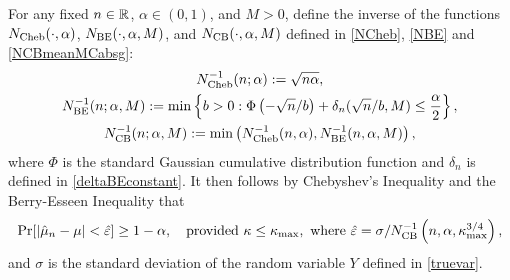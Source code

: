 \documentclass{iitthesis}
\theoremstyle{definition}
\begin{document}
For any fixed $n \in \mathbb{R}$, $\alpha \in (0,1)$, and $M>0$, define the inverse of the functions $N_{\text{Cheb}}(\cdot,\alpha)$, $N_{\text{BE}}(\cdot,\alpha,M)$, and $N_{\text{CB}}(\cdot,\alpha,M)$ defined in \eqref{NCheb}, \eqref{NBE} and \eqref{NCBmeanMCabsg}:
\begin{gather}\label{NCinv*}
N_{\text{Cheb}}^{-1}(n;\alpha) := \sqrt{n \alpha}, \\
\label{NBinv*}
N_{\text{BE}}^{-1}(n;\alpha,M) := \min \left \{ b>0 : \Phi\left(-\sqrt{n}/b  \right)+\delta_n(\sqrt{n}/b,M)
\le \frac{\alpha}{2} \right \}, \\
\label{NCBinv}
N_{\text{CB}}^{-1}(n;\alpha,M) := \min\left(N_{\text{Cheb}}^{-1}(n,\alpha),N_{\text{BE}}^{-1}(n,\alpha,M)\right),
\end{gather}
where $\Phi$ is the standard Gaussian cumulative distribution function and $\delta_n$ is defined in \eqref{deltaBEconstant}. It then follows by Chebyshev's Inequality and the Berry-Esseen Inequality that 
\begin{equation*}
\Pr[\left \lvert \hat{\mu}_n -\mu \right \rvert<\hat{\varepsilon}] \geq 1-\alpha, \quad \text{provided } \kappa\leq\kappa_{\max}, \text{ where }\hat{\varepsilon}=\sigma/N_{\text{CB}}^{-1}\left(n,\alpha,\kappa_{\max}^{3/4}\right), 
\end{equation*} 
and $\sigma$ is the standard deviation of the random variable $Y$ defined in \eqref{truevar}.  
\end{document}
